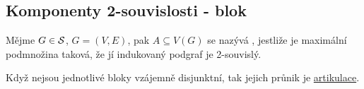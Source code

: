 \subsection{Komponenty 2-souvislosti - blok}
Mějme $G \in \S$, $G = (V,E)$, pak $A \subseteq V(G)$ se nazývá , jestliže je maximální podmnožina taková, že 
jí indukovaný podgraf je 2-souvislý. \\
\begin{figure}[H]
    \centering
\end{figure}
Když nejsou jednotlivé bloky vzájemně disjunktní, tak jejich průnik je \hyperref[artikulace]{artikulace}.
